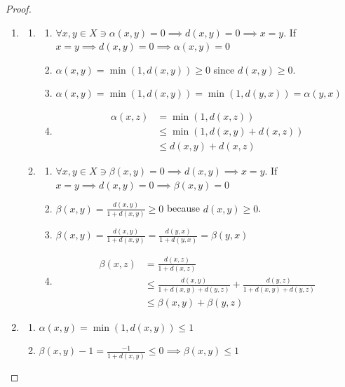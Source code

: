\documentclass{article}
\begin{document}
\begin{proof}
    \begin{enumerate}
        \item \begin{enumerate}
            \item \begin{enumerate}
                \item $\forall x, y \in X \ni \alpha(x, y) = 0 \implies d(x, y) = 0 \implies x = y$. If $x = y \implies d(x, y) = 0 \implies \alpha(x, y) = 0$
                \item $\alpha(x, y) = \min(1, d(x, y)) \geq 0$ since $d(x, y) \geq 0$.  
                \item $\alpha(x, y) = \min(1, d(x,y))= \min(1, d(y,x)) = \alpha(y,x)$
                \item \begin{align*}
                    \alpha(x, z) &= \min(1, d(x, z)) \\
                    &\leq \min(1, d(x, y) + d(x, z)) \\
                    &\leq d(x, y) + d(x, z)
                \end{align*}  
            \end{enumerate}
            \item \begin{enumerate}
                \item $\forall x, y \in X \ni \beta(x, y) = 0 \implies d(x, y) \implies x = y$. If $x =y \implies d(x, y) = 0 \implies \beta(x, y) = 0$ 
                \item $\beta(x, y) = \frac{d(x, y)}{1 + d(x, y)} \geq 0$ because $d(x, y) \geq 0$. 
                \item $\beta(x, y) = \frac{d(x, y)}{1 + d(x, y)} = \frac{d(y,x)}{1 + d(y,x)} = \beta(y,x)$
                \item \begin{align*}
                    \beta(x, z) &= \frac{d(x,z)}{1 + d(x,z)} \\
                    &\leq \frac{d(x, y)}{1 + d(x, y) + d(y,z)} + \frac{d(y, z)}{1 + d(x, y) + d(y,z)} \\
                    &\leq \beta(x, y) + \beta(y ,z)
                \end{align*}   
            \end{enumerate}
        \end{enumerate}
        \item \begin{enumerate}
            \item $\alpha(x, y) = \min\left(1, d(x, y)\right)\leq 1$
            \item $\beta(x, y) - 1 = \frac{-1}{1 + d(x, y)} \leq 0 \implies \beta(x, y) \leq 1$  
        \end{enumerate}
        

\end{enumerate}
\end{proof}
\end{document}
